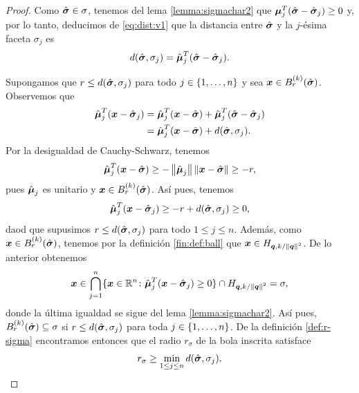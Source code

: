 \begin{proof}
	Como $\hat{\boldsymbol{ \sigma }} \in \sigma$, tenemos del lema \ref{lemma:sigmachar2} que
	$\boldsymbol{\mu}_j^T(\hat{\boldsymbol{ \sigma }} - \hat{\boldsymbol{ \sigma }}_j) \geq 0$ y, por lo tanto, deducimos de \eqref{eq:dist:v1}
	que la distancia entre $\hat{\boldsymbol{ \sigma }}$ y la $j$-ésima faceta $\sigma_j$ es
	\begin{equation}
		\label{eq:dist}
		d(\hat{\boldsymbol{ \sigma }}, \sigma_j) = \hat{\boldsymbol{\mu}}_j^T(\hat{\boldsymbol{ \sigma }} - \hat{\boldsymbol{ \sigma }}_j).
	\end{equation}

	Supongamos que $r \leq d(\hat{\boldsymbol{ \sigma }}, \sigma_j)$ para todo $j \in \lbrace 1, \ldots, n \rbrace$ y sea
	$\boldsymbol{x} \in B_r^{(k)}(\hat{\boldsymbol{ \sigma }})$. Observemos que
	\begin{align*}
		\hat{\boldsymbol{\mu}}_j^T(\boldsymbol{x} - \hat{\boldsymbol{ \sigma }}_j)
		&= 
		\hat{\boldsymbol{\mu}}_j^T(\boldsymbol{x} - \hat{\boldsymbol{ \sigma }})
		+
		\hat{\boldsymbol{\mu}}_j^T(\hat{\boldsymbol{ \sigma }} - \hat{\boldsymbol{ \sigma }}_j) \\
		&=
		\hat{\boldsymbol{\mu}}_j^T(\boldsymbol{x} - \hat{\boldsymbol{ \sigma }}) + d(\hat{\boldsymbol{ \sigma }}, \sigma_j).
	\end{align*}
	Por la desigualdad de Cauchy-Schwarz, tenemos
	\begin{equation*}
		\hat{\boldsymbol{\mu}}_j^T(\boldsymbol{x} - \hat{\boldsymbol{ \sigma }}) \geq -\left\lVert \hat{\boldsymbol{\mu}}_j \right\rVert\left\lVert \boldsymbol{x} -
		\hat{\boldsymbol{ \sigma }} \right\rVert \geq -r,
	\end{equation*}
	pues $\hat{\boldsymbol{\mu}}_j$ es unitario y $\boldsymbol{x} \in B_r^{(k)}(\hat{\boldsymbol{ \sigma }})$. Así pues, tenemos
	\begin{equation*}
		\hat{\boldsymbol{\mu}}_j^T(\boldsymbol{x} - \hat{\boldsymbol{ \sigma }}_j) \geq -r + d(\hat{\boldsymbol{ \sigma }}, \sigma_j) \geq 0,
	\end{equation*}
	daod que supusimos $r \leq d(\hat{\boldsymbol{ \sigma }}, \sigma_j)$ para todo $1 \leq j \leq n$. Además, como
	$\boldsymbol{x} \in B_r^{(k)}(\hat{\boldsymbol{ \sigma }})$, tenemos por la definición \ref{fin:def:ball} que $\boldsymbol{x}
	\in H_{\boldsymbol{\boldsymbol{q}}, k/\left\lVert \boldsymbol{\boldsymbol{q}} \right\rVert^{2}}$. De lo anterior obtenemos
	\begin{equation*}
		\boldsymbol{x} \in
		\bigcap_{j=1}^{n}
		\lbrace \boldsymbol{x} \in \mathbb{R}^n \colon \hat{\boldsymbol{\mu}}_j^T(\boldsymbol{x} - \hat{\boldsymbol{ \sigma }}_j) \geq 0 \rbrace
		\cap H_{\boldsymbol{\boldsymbol{q}}, k/\left\lVert \boldsymbol{\boldsymbol{q}} \right\rVert^{2}} = \sigma,
	\end{equation*}
	donde la última igualdad se sigue del lema \ref{lemma:sigmachar2}. Así pues,
	$B_r^{(k)}(\hat{\boldsymbol{ \sigma }}) \subseteq \sigma$ si $r \leq d(\hat{\boldsymbol{ \sigma }}, \sigma_j)$ para toda $j
	\in \lbrace 1, \ldots, n \rbrace$. De la definición \ref{def:r-sigma} encontramos entonces que el radio
	$r_\sigma$ de la bola inscrita satisface
	\begin{equation}
		\label{r-sigma:down}
		r_\sigma \geq \min_{1 \leq j \leq n}d(\hat{\boldsymbol{ \sigma }}, \sigma_j).
	\end{equation}


\end{proof}
